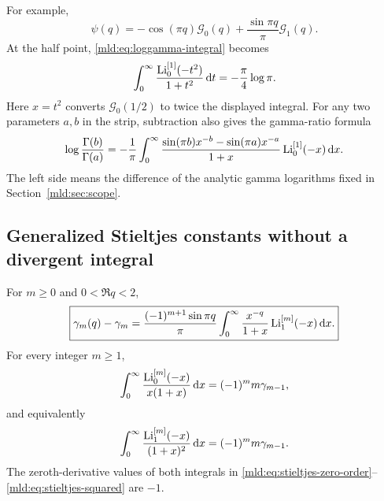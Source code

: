 For example,
\[
 \psi(q)=-\cos(\pi q)\mathcal G_0(q)
                  +\frac{\sin\pi q}{\pi}\mathcal G_1(q).
\]
At the half point, \eqref{mld:eq:loggamma-integral} becomes
\begin{equation}\label{mld:eq:gamma-half-integral}
 \int_0^\infty\frac{\operatorname{Li}_0^{[1]}(-t^2)}{1+t^2}\,\mathrm{d} t
       =-\frac\pi4\log\pi.
\end{equation}
Here $x=t^2$ converts $\mathcal G_0(1/2)$ to twice the displayed integral.
For any two parameters $a,b$ in the strip, subtraction also gives the gamma-ratio formula
\begin{align}\label{mld:eq:gamma-ratio-integral}
 \log\frac{\Gamma(b)}{\Gamma(a)}
   =-\frac1\pi\int_0^\infty
       \frac{\sin(\pi b)x^{-b}-\sin(\pi a)x^{-a}}{1+x}
                         \operatorname{Li}_0^{[1]}(-x)\,\mathrm{d} x.
\end{align}
The left side means the difference of the analytic gamma logarithms fixed in Section~\ref{mld:sec:scope}.

\subsection{Generalized Stieltjes constants without a divergent integral}

\begin{theorem}\label{mld:thm:stieltjes-kernel}
For $m\ge0$ and $0<\Re q<2$,
\begin{equation}\label{mld:eq:stieltjes-kernel}
 \boxed{\displaystyle
 \gamma_m(q)-\gamma_m
 =\frac{(-1)^{m+1}\sin\pi q}{\pi}
       \int_0^\infty\frac{x^{-q}}{1+x}\operatorname{Li}_1^{[m]}(-x)\,\mathrm{d} x.}
\end{equation}
For every integer $m\ge1$,
\begin{equation}\label{mld:eq:stieltjes-zero-order}
 \int_0^\infty\frac{\operatorname{Li}_0^{[m]}(-x)}{x(1+x)}\,\mathrm{d} x
       =(-1)^m m\gamma_{m-1},
\end{equation}
and equivalently
\begin{equation}\label{mld:eq:stieltjes-squared}
 \int_0^\infty\frac{\operatorname{Li}_1^{[m]}(-x)}{(1+x)^2}\,\mathrm{d} x
       =(-1)^m m\gamma_{m-1}.
\end{equation}
The zeroth-derivative values of both integrals in
\eqref{mld:eq:stieltjes-zero-order}--\eqref{mld:eq:stieltjes-squared} are $-1$.
\end{theorem}

